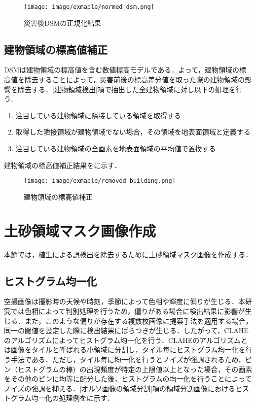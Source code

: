       \begin{figure}[t]
        \centering
        \texttt{[image: image/exmaple/normed\_dsm.png]}
        \caption{災害後DSMの正規化結果}
        \label{正規化結果}
      \end{figure}


    \subsection{建物領域の標高値補正}
      DSMは建物領域の標高値を含む数値標高モデルである．よって，建物領域の標高値を除去することによって，災害前後の標高差分値を取った際の建物領域の影響を除去する．\ref{建物領域検出}項で抽出した全建物領域に対し以下の処理を行う．

      \begin{enumerate}
        \setlength{\itemsep}{-5pt}
        \item 注目している建物領域に隣接している領域を取得する
        \item 取得した隣接領域が建物領域でない場合，その領域を地表面領域と定義する
        \item 注目している建物領域の全画素を地表面領域の平均値で置換する
      \end{enumerate}

      建物領域の標高値補正結果をに示す．

      \begin{figure}[t]
        \centering
        \texttt{[image: image/exmaple/removed\_building.png]}
        \caption{建物領域の標高値補正}
        \label{建物領域の標高値補正結果}
      \end{figure}



  \section{土砂領域マスク画像作成}
    \label{土砂領域マスク画像作成}
    本節では，植生による誤検出を除去するために土砂領域マスク画像を作成する．


    \subsection{ヒストグラム均一化}
      空撮画像は撮影時の天候や時刻，季節によって色相や輝度に偏りが生じる．本研究では色相によって判別処理を行うため，偏りがある場合に検出結果に影響が生じる．また，このような偏りが存在する複数枚画像に提案手法を適用する場合，同一の閾値を設定した際に検出結果にばらつきが生じる．したがって，CLAHEのアルゴリズム\cite{CLAHEのアルゴリズム}によってヒストグラム均一化を行う．CLAHEのアルゴリズムとは画像をタイルと呼ばれる小領域に分割し，タイル毎にヒストグラム均一化を行う手法である．ただし，タイル毎に均一化を行うとノイズが強調されるため，ビン（ヒストグラムの棒）の出現頻度が特定の上限値以上となった場合，その画素をその他のビンに均等に配分した後，ヒストグラムの均一化を行うことによってノイズの強調を抑える．\ref{オルソ画像の領域分割}項の領域分割画像におけるヒストグラム均一化の処理例をに示す．

